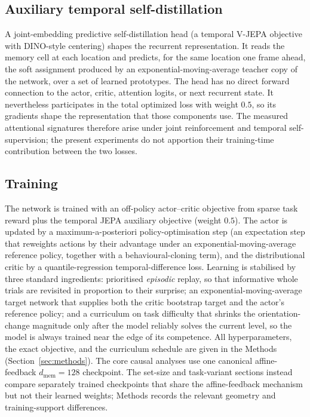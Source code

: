 \subsection{Auxiliary temporal self-distillation}
\label{sec:model-jepa}

A joint-embedding predictive self-distillation head (a temporal V-JEPA
objective with DINO-style centering) shapes the recurrent representation.
It reads the memory cell at each location and predicts, for the same
location one frame ahead, the soft assignment produced by an
exponential-moving-average teacher copy of the network, over a set of
learned prototypes. The head has no direct forward connection to the actor, critic, attention
logits, or next recurrent state. It nevertheless participates in the total
optimized loss with weight $0.5$, so its gradients shape the representation
that those components use. The measured attentional signatures therefore
arise under joint reinforcement and temporal self-supervision; the present
experiments do not apportion their training-time contribution between the
two losses.

\subsection{Training}
\label{sec:model-training}

The network is trained with an off-policy actor--critic objective from sparse
task reward plus the temporal JEPA auxiliary objective (weight $0.5$). The actor is updated by a
maximum-a-posteriori policy-optimisation step (an expectation step that
reweights actions by their advantage under an exponential-moving-average
reference policy, together with a behavioural-cloning term), and the
distributional critic by a quantile-regression temporal-difference loss.
Learning is stabilised by three standard ingredients: prioritised
\emph{episodic} replay, so that informative whole trials are revisited in
proportion to their surprise; an exponential-moving-average target
network that supplies both the critic bootstrap target and the actor's
reference policy; and a curriculum on task difficulty that shrinks the
orientation-change magnitude only after the model reliably solves the
current level, so the model is always trained near the edge of its
competence. All hyperparameters, the exact objective, and the curriculum
schedule are given in the Methods (Section~\ref{sec:methods}). The core causal analyses use one canonical affine-feedback $d_{\mathrm{mem}}=128$
checkpoint. The set-size and task-variant sections instead compare separately trained
checkpoints that share the affine-feedback mechanism but not their learned weights;
Methods records the relevant geometry and training-support differences.


